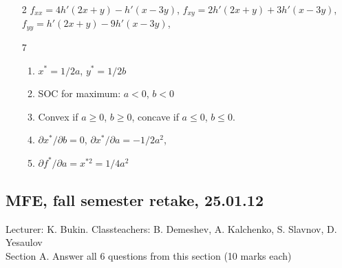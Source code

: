 \documentclass[12pt]{article} %
\theoremstyle{definition} %
\begin{document}
\begin{enumerate}
\item[2]
$f_{xx}=4h'(2x+y)-h'(x-3y)$,
$f_{xy}=2h'(2x+y)+3h'(x-3y)$,
$f_{yy}=h'(2x+y)-9h'(x-3y)$,


\item[7]
\begin{enumerate}
\item $x^*=1/2a$, $y^*=1/2b$
\item SOC for maximum: $a<0$, $b<0$
\item Convex if $a\geq 0$, $b\geq 0$, concave if $a \leq 0$, $b \leq 0$.
\item $\partial x^*/\partial b=0$, $\partial x^*/\partial a=-1/2a^2$,
\item  $\partial f^*/\partial a= x^{*2}=1/4a^2$
\end{enumerate}
\end{enumerate}

\subsection{MFE, fall semester retake, 25.01.12 }

Lecturer: K. Bukin. Classteachers: B. Demeshev, A. Kalchenko, S. Slavnov, D. Yesaulov \\

Section A. Answer all 6 questions from this section (10 marks each)
\end{document}
